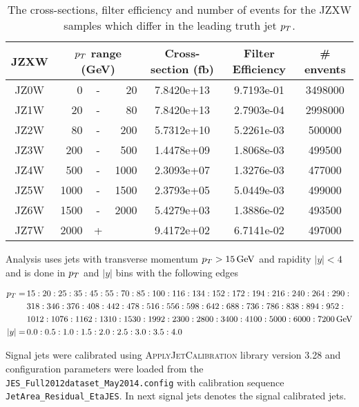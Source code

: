 \begin{table}
  \centering
  \begin{tabular}{|c|rcr|c|c|c|}
    \hline 
     JZXW & \multicolumn{3}{|c|}{$p_{T}$ range (GeV)} & Cross-section (fb) & Filter Efficiency & \# envents  \\ 
    \hline
    \hline
		 JZ0W &     0 & - &    20 & 7.8420e+13 & 9.7193e-01 & 3498000 \\ 
    \hline
		 JZ1W &    20 & - &    80 & 7.8420e+13 & 2.7903e-04 & 2998000 \\
    \hline
		 JZ2W &    80 & - &   200 & 5.7312e+10 & 5.2261e-03 & 500000  \\
    \hline
		 JZ3W &   200 & - &   500 & 1.4478e+09 & 1.8068e-03 & 499500  \\
    \hline
		 JZ4W &   500 & - &  1000 & 2.3093e+07 & 1.3276e-03 & 477000  \\
    \hline
		 JZ5W &  1000 & - &  1500 & 2.3793e+05 & 5.0449e-03 & 499000  \\
    \hline
		 JZ6W &  1500 & - &  2000 & 5.4279e+03 & 1.3886e-02 & 493500  \\
    \hline
		 JZ7W &  2000 & + &       & 9.4172e+02 & 6.7141e-02 & 497000  \\
    \hline 
  \end{tabular}
  \caption{The cross-sections, filter efficiency and number of events for the JZXW samples which differ in the leading truth jet $p_{T}$.}
  \label{tab:JZXW}
\end{table}

Analysis uses jets with transverse momentum $p_{T} > 15\,\text{GeV}$ and rapidity $|y| <
4$ and is done in $p_{T}$ and $|y|$ bins with the following edges

\small
\begin{align}
  p_{T} = \, &15:20:25:35:45:55:70:85:100:116:134:152:172:194:216:240:264:290: \nonumber \\
        &318:346:376:408:442:478:516:556:598:642:688:736:786:838:894:952: \nonumber \\
        &1012:1076:1162:1310:1530:1992:2300:2800:3400:4100:5000:6000:7200 \,\text{GeV} \nonumber \\
  |y| = \, &0.0:0.5:1.0:1.5:2.0:2.5:3.0:3.5:4.0
  \label{eq:Binning}
\end{align}
\normalsize

Signal jets were calibrated using \textsc{ApplyJetCalibration} library version
3.28 and configuration parameters were loaded from the
\texttt{JES\_Full2012dataset\_May2014.config} with calibration sequence
\texttt{JetArea\_Residual\_EtaJES}. In next signal jets denotes the signal
calibrated jets.

